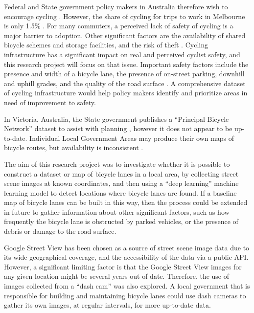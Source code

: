 \documentclass[11pt,twoside]{report}
\begin{document}
Federal and State government policy makers in Australia therefore wish to encourage cycling \cite{federal_policy_2019} \cite{state_policy_2020}.  However, the share of cycling for trips to work in Melbourne is only 1.5\% \cite{melbactive}.  For many commuters, a perceived lack of safety of cycling is a major barrier to adoption.  Other significant factors are the availability of shared bicycle schemes and storage facilities, and the risk of theft \cite{WILSON2018234}.  Cycling infrastructure has a significant impact on real and perceived cyclist safety, and this research project will focus on that issue.  Important safety factors include the presence and width of a bicycle lane, the presence of on-street parking, downhill and uphill grades, and the quality of the road surface \cite{BIKESAFETY} \cite{Teschke2012}.  A comprehensive dataset of cycling infrastructure would help policy makers identify and prioritize areas in need of improvement to safety.

In Victoria, Australia, the State government publishes a ``Principal Bicycle Network'' dataset to assist with planning \cite{PrincipalBicycleNetwork}, however it does not appear to be up-to-date.  Individual Local Government Areas may produce their own maps of bicycle routes, but availability is inconsistent \cite{vicroads_maps}.

The aim of this research project was to investigate whether it is possible to construct a dataset or map of bicycle lanes in a local area, by collecting street scene images at known coordinates, and then using a ``deep learning'' machine learning model to detect locations where bicycle lanes are found.  If a baseline map of bicycle lanes can be built in this way, then the process could be extended in future to gather information about other significant factors, such as how frequently the bicycle lane is obstructed by parked vehicles, or the presence of debris or damage to the road surface.

Google Street View has been chosen as a source of street scene image data due to its wide geographical coverage, and the accessibility of the data via a public API.  However, a significant limiting factor is that the Google Street View images for any given location might be several years out of date.  Therefore, the use of images collected from a ``dash cam'' was also explored.  A local government that is responsible for building and maintaining bicycle lanes could use dash cameras to gather its own images, at regular intervals, for more up-to-date data.
\end{document}
